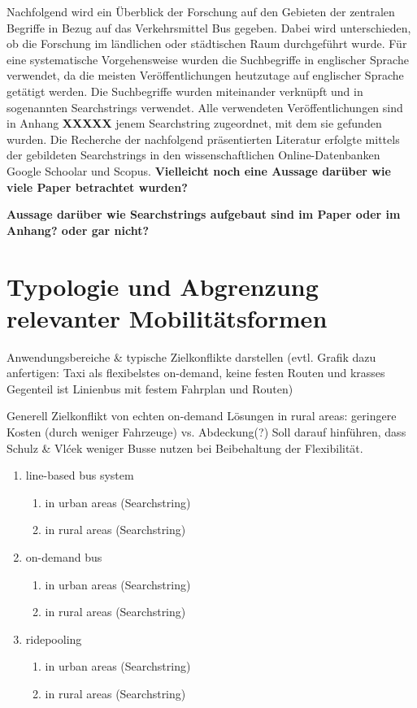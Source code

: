 Nachfolgend wird ein Überblick der Forschung auf den Gebieten der zentralen Begriffe in Bezug auf das Verkehrsmittel Bus gegeben. Dabei wird unterschieden, ob die Forschung im ländlichen oder städtischen Raum durchgeführt wurde. Für eine  systematische Vorgehensweise wurden die Suchbegriffe in englischer Sprache verwendet, da die meisten Veröffentlichungen heutzutage auf englischer Sprache getätigt werden. Die Suchbegriffe wurden miteinander verknüpft und in sogenannten Searchstrings verwendet. Alle verwendeten Veröffentlichungen sind in Anhang \textbf{XXXXX} jenem Searchstring zugeordnet, mit dem sie gefunden wurden. Die Recherche der nachfolgend präsentierten Literatur erfolgte mittels der gebildeten Searchstrings in den wissenschaftlichen Online-Datenbanken Google Schoolar und Scopus. \textbf{Vielleicht noch eine Aussage darüber wie viele Paper betrachtet wurden?}

\textbf{Aussage darüber wie Searchstrings aufgebaut sind im Paper oder im Anhang? oder gar nicht?}


\section{Typologie und Abgrenzung relevanter Mobilitätsformen}
\label{sec:2.1}
\label{sec:Kontext}

Anwendungsbereiche \& typische Zielkonflikte darstellen (evtl. Grafik dazu anfertigen: Taxi als flexibelstes on-demand, keine festen Routen und krasses Gegenteil ist Linienbus mit festem Fahrplan und Routen)

Generell Zielkonflikt von echten on-demand Lösungen in rural areas: geringere Kosten (durch weniger Fahrzeuge) vs. Abdeckung(?) Soll darauf hinführen, dass Schulz \& Vlćek weniger Busse nutzen bei Beibehaltung der Flexibilität.

\begin{enumerate}
    \item line-based bus system
    \begin{enumerate}
        \item in urban areas (Searchstring)
        \item in rural areas (Searchstring)
    \end{enumerate}
    \item on-demand bus
    \begin{enumerate}
        \item in urban areas (Searchstring)
        \item in rural areas (Searchstring)
    \end{enumerate}
    \item ridepooling
    \begin{enumerate}
        \item in urban areas (Searchstring)
        \item in rural areas (Searchstring)
    \end{enumerate}
\end{enumerate}



